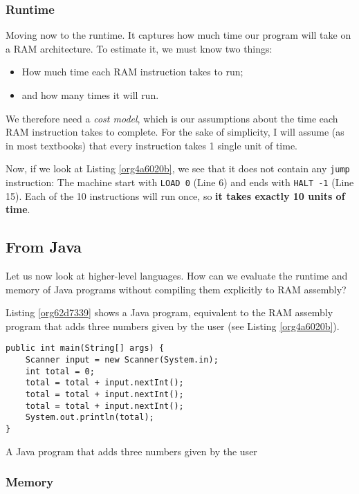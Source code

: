 \documentclass[11pt]{article}
\begin{document}
\subsubsection*{Runtime}
\label{sec:orgd62d916}

Moving now to the runtime. It captures how much time our program will
take on a RAM architecture. To estimate it, we must know two things:
\begin{itemize}
\item How much time each RAM instruction takes to run;
\item and how many times it will run.
\end{itemize}

We therefore need a \emph{cost model}, which is our assumptions about the
time each RAM instruction takes to complete. For the sake of
simplicity, I will assume (as in most textbooks) that every
instruction takes 1 single unit of time.

Now, if we look at Listing \ref{org4a6020b}, we see that it
does not contain any \texttt{jump} instruction: The machine start with \texttt{LOAD
0} (Line 6) and ends with \texttt{HALT -1} (Line 15). Each of the 10
instructions will run once, so \textbf{it takes exactly 10 units of time}.

\subsection{From Java}
\label{sec:org2e40006}

Let us now look at higher-level languages. How can we evaluate the
runtime and memory of Java programs without compiling them explicitly
to RAM assembly?

Listing \ref{org62d7339} shows a Java program, equivalent to the
RAM assembly program that adds three numbers given by the user (see
Listing \ref{org4a6020b}).

\begin{listing}[htbp]
\begin{verbatim}
public int main(String[] args) {
    Scanner input = new Scanner(System.in);
    int total = 0;
    total = total + input.nextInt();
    total = total + input.nextInt();
    total = total + input.nextInt();
    System.out.println(total);
}
\end{verbatim}
\caption{\label{org62d7339}A Java program that adds three numbers given by the user}
\end{listing}

\subsubsection*{Memory}
\label{sec:orge505d1e}
\end{document}
